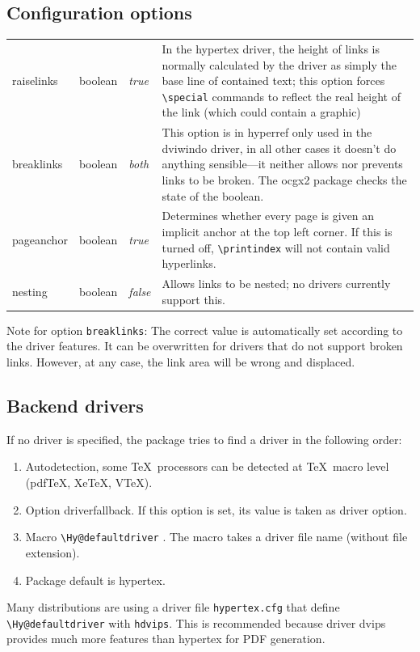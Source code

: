 \documentclass{article}
\newcommand*{\cs}[1]{%
  \texttt{\textbackslash #1}%
}
\newcommand*{\xpackage}[1]{\textsf{#1}}
\begin{document}
\subsection{Configuration options}

\begin{longtable}{>{\ttfamily}ll>{\itshape}lp{9cm}}
raiselinks & boolean & true  & In the hypertex driver, the height of links is normally calculated by the driver as
                               simply the base line of contained text; this option forces \verb|\special| commands to
                               reflect the real height of the link (which could contain a graphic) \\
breaklinks & boolean & both & This option is in \xpackage{hyperref} only used in the dviwindo driver, in all other cases it doesn't do anything sensible---it neither allows nor prevents links to be broken. The ocgx2 package
checks the state of the boolean.\\
pageanchor & boolean & true  & Determines whether every page is given an implicit anchor at the top left corner. If this
                               is turned off, \verb|\printindex| will not contain
                               valid hyperlinks. \\
nesting    & boolean & false & Allows links to be nested; no drivers currently support this.
\end{longtable}

Note for option \verb|breaklinks|:
The correct value is automatically set according to the driver features.
It can be overwritten for drivers that do not support broken links.
However, at any case, the link area will be wrong and displaced.

\subsection{Backend drivers}

If no driver is specified, the package tries to find a driver in
the following order:
\begin{enumerate}
\item Autodetection, some \TeX\ processors can be detected at \TeX\ macro
  level (pdf\TeX, Xe\TeX, V\TeX).
\item Option \textsf{driverfallback}. If this option is set, its value
  is taken as driver option.
\item Macro \cs{Hy@defaultdriver}. The macro takes a driver file
  name (without file extension).
\item Package default is \textsf{hypertex}.
\end{enumerate}
Many distributions are using a driver file \texttt{hypertex.cfg} that
define \cs{Hy@defaultdriver} with \texttt{hdvips}. This is recommended
because driver \textsf{dvips} provides much more features than
\textsf{hypertex} for PDF generation.
\end{document}
